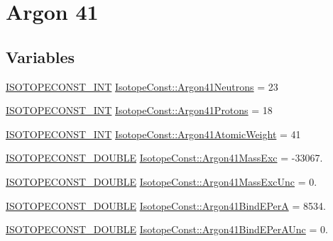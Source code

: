 \hypertarget{group___isotope_const-_argon-_ar41}{}\section{Argon 41}
\label{group___isotope_const-_argon-_ar41}
\subsection*{Variables}
\begin{DoxyCompactItemize}
\item 
\mbox{\hyperlink{group___isotope_const-_macros_ga5f18360b3e99483a35c32d789e62621c}{I\+S\+O\+T\+O\+P\+E\+C\+O\+N\+S\+T\+\_\+\+I\+NT}} \mbox{\hyperlink{group___isotope_const-_argon-_ar41_ga84abbc33c89e03eab733c86fd6a5dc23}{Isotope\+Const\+::\+Argon41\+Neutrons}} = 23
\item 
\mbox{\hyperlink{group___isotope_const-_macros_ga5f18360b3e99483a35c32d789e62621c}{I\+S\+O\+T\+O\+P\+E\+C\+O\+N\+S\+T\+\_\+\+I\+NT}} \mbox{\hyperlink{group___isotope_const-_argon-_ar41_gaef6b5556ad07f51a5aeec05001eadeb6}{Isotope\+Const\+::\+Argon41\+Protons}} = 18
\item 
\mbox{\hyperlink{group___isotope_const-_macros_ga5f18360b3e99483a35c32d789e62621c}{I\+S\+O\+T\+O\+P\+E\+C\+O\+N\+S\+T\+\_\+\+I\+NT}} \mbox{\hyperlink{group___isotope_const-_argon-_ar41_ga0d72a8348773ac3bad0d423cb36c96b0}{Isotope\+Const\+::\+Argon41\+Atomic\+Weight}} = 41
\item 
\mbox{\hyperlink{group___isotope_const-_macros_ga8f45a7272ce02c0b4c65c44636ed719a}{I\+S\+O\+T\+O\+P\+E\+C\+O\+N\+S\+T\+\_\+\+D\+O\+U\+B\+LE}} \mbox{\hyperlink{group___isotope_const-_argon-_ar41_ga868cd5d9c19cdfc200e595c8674717f2}{Isotope\+Const\+::\+Argon41\+Mass\+Exc}} = -\/33067.
\item 
\mbox{\hyperlink{group___isotope_const-_macros_ga8f45a7272ce02c0b4c65c44636ed719a}{I\+S\+O\+T\+O\+P\+E\+C\+O\+N\+S\+T\+\_\+\+D\+O\+U\+B\+LE}} \mbox{\hyperlink{group___isotope_const-_argon-_ar41_ga7fa430979476564dee470f7bfc0a4723}{Isotope\+Const\+::\+Argon41\+Mass\+Exc\+Unc}} = 0.
\item 
\mbox{\hyperlink{group___isotope_const-_macros_ga8f45a7272ce02c0b4c65c44636ed719a}{I\+S\+O\+T\+O\+P\+E\+C\+O\+N\+S\+T\+\_\+\+D\+O\+U\+B\+LE}} \mbox{\hyperlink{group___isotope_const-_argon-_ar41_ga5804a477d28f69c9909ecc43436450cb}{Isotope\+Const\+::\+Argon41\+Bind\+E\+PerA}} = 8534.
\item 
\mbox{\hyperlink{group___isotope_const-_macros_ga8f45a7272ce02c0b4c65c44636ed719a}{I\+S\+O\+T\+O\+P\+E\+C\+O\+N\+S\+T\+\_\+\+D\+O\+U\+B\+LE}} \mbox{\hyperlink{group___isotope_const-_argon-_ar41_gabe0ad69e1b1f81a239122c8b2a5b34b6}{Isotope\+Const\+::\+Argon41\+Bind\+E\+Per\+A\+Unc}} = 0.

\end{DoxyCompactItemize}
